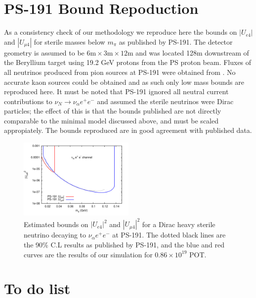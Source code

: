 \documentclass[11pt, a4paper]{article}
\begin{document}
\section{PS-191 Bound Repoduction}

As a consistency check of our methodology we reproduce here the bounds on $|U_{e4}|$ and $|U_{\mu 4}|$ for sterile masses below $m_\pi$ as published by PS-191. The detector geometry is assumed to be
$6\text{m} \times 3\text{m} \times 12 \text{m}$ and was located 128m downstream
of the Beryllium target using 19.2 GeV protons from the PS proton beam.  Fluxes
of all neutrinos produced from pion sources at PS-191 were obtained from
\cite{ps191THesis}. No accurate kaon sources could be obtained and as such only
low mass bounds are reproduced here. It must be noted that PS-191 ignored all
neutral current contributions to $\nu_N \rightarrow \nu_\alpha e^+ e^-$ and
assumed the sterile neutrinos were Dirac particles; the effect of this is
that the bounds published are not directly comparable to the minimal model discussed
above, and must be scaled appropiately. The bounds reproduced are in good agreement with published data.

\begin{figure}
			  \centering
			 
\includegraphics[width=0.5\textwidth]{figures/PS-191_test.pdf}
\caption{\label{fig:ps191test} Estimated bounds on $|U_{e4}|^2$ and $|U_{\mu 4}|^2$ for a Dirac heavy sterile neutrino decaying to $\nu_\alpha e^+ e^-$ at PS-191. The dotted black lines are the 90\% C.L results as published by PS-191, and the blue and red curves are the results of our simulation for $0.86 \times 10^{19}$ POT.}
\end{figure}


\section{To do list}
\end{document}
